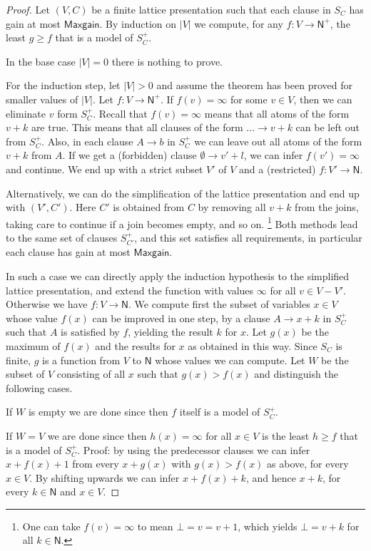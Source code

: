 \documentclass[11pt,a4paper]{article}
\newcommand{\N}{\mathsf{N}}
\newcommand\Ninf{\N^+}
\newcommand\M{\mathsf{Maxgain}}
\begin{document}
\begin{proof}
Let  $(V,C)$ be a finite lattice presentation
such that each clause in $S_C$ has gain at most $\M$.
By induction on $|V|$ we compute, for any $f: V\to\Ninf$,
the least $g \geq f$ that is a model of $S^+_C$.

In the base case $|V|=0$ there is nothing to prove.

For the induction step, let $|V|>0$ and assume the
theorem has been proved for smaller values of $|V|$.
Let $f: V\to\Ninf$. If $f(v)=\infty$ for some $v\in V$,
then we can eliminate $v$ form $S^+_C$. Recall that
$f(v)=\infty$ means that all atoms of the form $v+k$
are true. This means that all clauses of the form
$\ldots\to v+k$ can be left out from $S^+_C$.
Also, in each clause $A\to b$ in $S^+_C$
we can leave out all atoms of the form $v+k$ from $A$.
If we get a (forbidden) clause $\emptyset\to v'+l$,
we can infer $f(v')=\infty$ and continue.
We end up with a strict subset $V'$ of $V$ and a (restricted)
$f : V' \to \N$.

Alternatively, we can do the simplification of the lattice
presentation and end up with $(V',C')$. Here $C'$
is obtained from $C$ by removing all $v+k$ from the joins,
taking care to continue if a join becomes empty, and so on.%
\footnote{One can take $f(v)=\infty$ to mean $\bot=v=v+1$,
which yields $\bot=v+k$ for all $k\in\N$.}
Both methods lead to the same set of clauses $S^+_{C'}$,
and this set satisfies all requirements, in particular
each clause has gain at most $\M$.

In such a case we can directly apply the induction hypothesis
to the simplified lattice presentation, and extend the
function with values $\infty$ for all $v \in V-V'$.
Otherwise we have $f: V\to\N$.
We compute first the subset of variables $x\in V$ 
whose value $f(x)$ can be improved in one step,
by a clause $A\to x+k$ in $S^+_C$ such that $A$ is
satisfied by $f$, yielding the result $k$ for $x$. 
Let $g(x)$ be the maximum of $f(x)$ and the results
for $x$ as obtained in this way. Since $S_C$ is finite,
$g$ is a function from $V$ to $\N$ whose values we can
compute. Let $W$ be the subset of $V$ consisting of
all $x$ such that $g(x) > f(x)$ and distinguish the
following cases.

If $W$ is empty we are done since then $f$ itself 
is a model of $S^+_C$.

If $W = V$ we are done since then $h(x) = \infty$ for all 
$x \in V$ is the least $h \geq f$ that is a model of $S^+_C$.
Proof: by using the predecessor clauses we can infer
$x+f(x)+1$ from every $x+g(x)$ with $g(x)>f(x)$ as above,
for every $x\in V$. By shifting upwards we can infer
$x+f(x)+k$, and hence $x+k$, for every $k\in\N$ and $x\in V$.


\end{proof}
\end{document}
